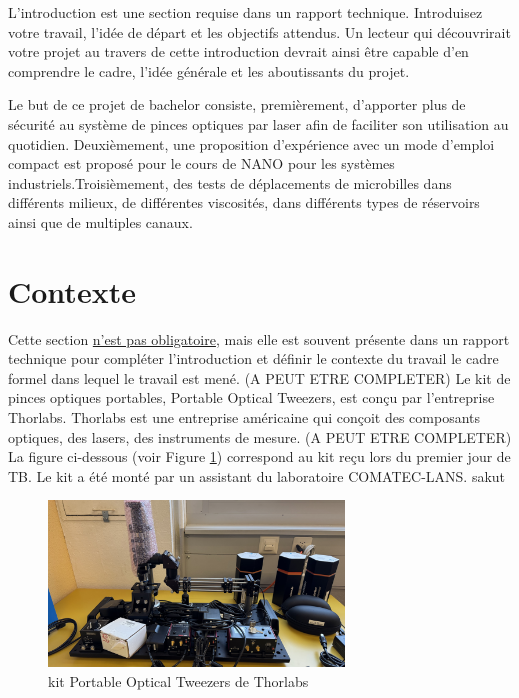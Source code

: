 L'introduction est une section requise dans un rapport technique. Introduisez votre travail, l'idée de départ et les objectifs attendus. Un lecteur qui découvrirait votre projet au travers de cette introduction devrait ainsi être capable d'en comprendre le cadre, l'idée générale et les aboutissants du projet.

Le but de ce projet de bachelor consiste, premièrement, d'apporter plus de sécurité au système de pinces optiques par laser afin de faciliter son utilisation au quotidien. Deuxièmement, une proposition d'expérience avec un mode d'emploi compact est proposé pour le cours de NANO pour les systèmes industriels.Troisièmement, des tests de déplacements de microbilles dans différents milieux, de différentes viscosités, dans différents types de réservoirs ainsi que de multiples canaux.

\section{Contexte}
Cette section \underline{n'est pas obligatoire}, mais elle est souvent présente dans un rapport technique pour compléter l'introduction et définir le contexte du travail \cad le cadre formel dans lequel le travail est mené. (A PEUT ETRE COMPLETER)
\newline\newline
Le kit de pinces optiques portables, Portable Optical Tweezers, est conçu par l'entreprise Thorlabs. Thorlabs est une entreprise américaine qui conçoit des composants optiques, des lasers, des instruments de mesure. (A PEUT ETRE COMPLETER)
\newline\newline
La figure ci-dessous (voir Figure \ref{kit vierge}) correspond au kit reçu lors du premier jour de TB. Le kit a été monté par un assistant du laboratoire COMATEC-LANS. sakut

\begin{figure}[H]
    \begin{center}
        \includegraphics[width=0.7\textwidth]{assets/figures/kit_vierge.jpeg}
    \end{center}
    \caption{kit Portable Optical Tweezers de Thorlabs}
    \label{kit vierge}
\end{figure}


















